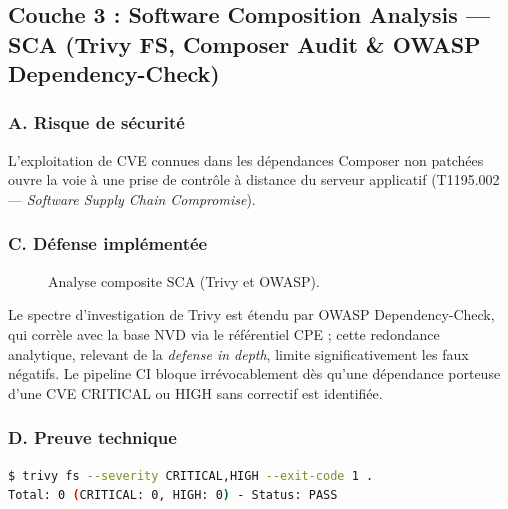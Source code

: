 \subsection{Couche 3 : Software Composition Analysis — SCA (Trivy FS, Composer Audit \& OWASP Dependency-Check)}

\subsubsection{A. Risque de sécurité}
L'exploitation de CVE connues dans les dépendances Composer non patchées ouvre la voie à une prise de contrôle à distance du serveur applicatif (T1195.002 — \textit{Software Supply Chain Compromise}).

\subsubsection{C. Défense implémentée}

\begin{figure}[H]
\centering
\scriptsize
{}
\caption{Analyse composite SCA (Trivy et OWASP).}
\end{figure}

Le spectre d'investigation de Trivy est étendu par OWASP Dependency-Check, qui corrèle avec la base NVD via le référentiel CPE ; cette redondance analytique, relevant de la \textit{defense in depth}, limite significativement les faux négatifs. Le pipeline CI bloque irrévocablement dès qu'une dépendance porteuse d'une CVE CRITICAL ou HIGH sans correctif est identifiée.

\subsubsection{D. Preuve technique}
\begin{lstlisting}[language=bash, caption={Sortie du scan SCA Trivy FS}, label={lst:sca_proof_layer}]
$ trivy fs --severity CRITICAL,HIGH --exit-code 1 .
Total: 0 (CRITICAL: 0, HIGH: 0) - Status: PASS
\end{lstlisting}

